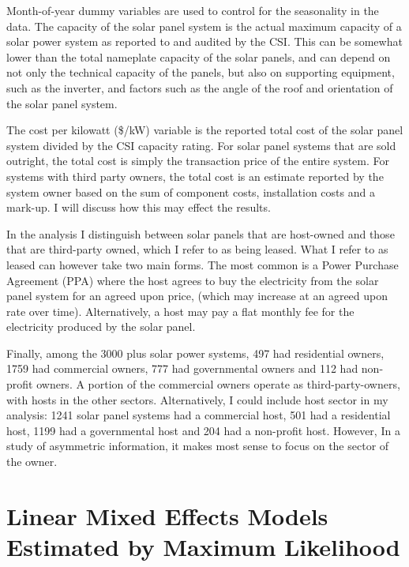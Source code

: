 \documentclass[a4paper]{article}
\begin{document}
Month-of-year dummy variables are used to control for the seasonality in the data. The capacity of the solar panel system is the actual maximum capacity of a solar power system as reported to and audited by the CSI. This can be somewhat lower than the total nameplate capacity of the solar panels, and can depend on not only the technical capacity of the panels, but also on supporting equipment, such as the inverter, and factors such as the angle of the roof and orientation of the solar panel system.

The cost per kilowatt (\$/kW) variable is the reported total cost of the solar panel system divided by the CSI capacity rating. For solar panel systems that are sold outright, the total cost is simply the transaction price of the entire system. For systems with third party owners, the total cost is an estimate reported by the system owner based on the sum of component costs, installation costs and a mark-up. I will discuss how this may effect the results.

In the analysis I distinguish between solar panels that are host-owned and those that are third-party owned, which I refer to as being leased. What I refer to as leased can however take two main forms. The most common is a Power Purchase Agreement (PPA) where the host agrees to buy the electricity from the solar panel system for an agreed upon price, (which may increase at an agreed upon rate over time). Alternatively, a host may pay a flat monthly fee for the electricity produced by the solar panel.

Finally, among the 3000 plus solar power systems, 497 had residential owners, 1759 had commercial owners, 777 had governmental owners and 112 had non-profit owners. A portion of the commercial owners operate as third-party-owners, with hosts in the other sectors. Alternatively, I could include host sector in my analysis: 1241 solar panel systems had a commercial host, 501 had a residential host, 1199 had a governmental host and 204 had a non-profit host. However, In a study of asymmetric information, it makes most sense to focus on the sector of the owner.


\section{Linear Mixed Effects Models Estimated by Maximum Likelihood}
\end{document}

